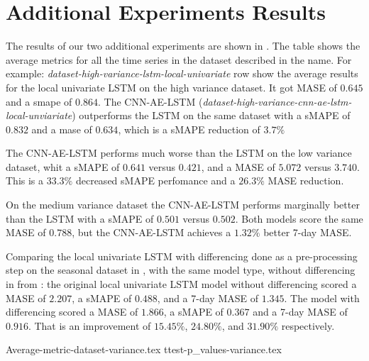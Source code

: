 \section{Additional Experiments Results}
\label{section:Results:AdditionalExperimentResults}
The results of our two additional experiments are shown in .
The table shows the average metrics for all the time series in the dataset described in the name.
For example: \textit{dataset-high-variance-lstm-local-univariate} row show the average
results for the local univariate LSTM on the high variance dataset.
It got MASE of $0.645$ and a smape of $0.864$. The CNN-AE-LSTM (\textit{dataset-high-variance-cnn-ae-lstm-local-unviariate}) outperforms the LSTM on
the same dataset with a sMAPE of $0.832$ and a mase of $0.634$, which is a sMAPE reduction of $3.7\%$

The CNN-AE-LSTM performs much worse than the LSTM on the low variance dataset,
whit a sMAPE of $0.641$ versus $0.421$, and a MASE of $5.072$ versus $3.740$.
This is a $33.3\%$ decreased sMAPE perfomance and a $26.3\%$ MASE reduction.

On the medium variance dataset the CNN-AE-LSTM performs marginally better than the LSTM
with a sMAPE of $0.501$ versus $0.502$. Both models score the same MASE of $0.788$, but the
CNN-AE-LSTM achieves a $1.32\%$ better 7-day MASE.

Comparing the local univariate LSTM with differencing done as a pre-processing step
on the seasonal dataset in ,
with the same model type, without differencing in 
from :
the original local univariate LSTM model without differencing scored a MASE of
$2.207$, a sMAPE of $0.488$, and a 7-day MASE of $1.345$.
The model with differencing scored a MASE of $1.866$, a sMAPE of $0.367$ and a 7-day MASE of
$0.916$. That is an improvement of $15.45\%$, $24.80\%$, and $31.90\%$ respectively.

{Average-metric-dataset-variance.tex}
{ttest-p_values-variance.tex}

